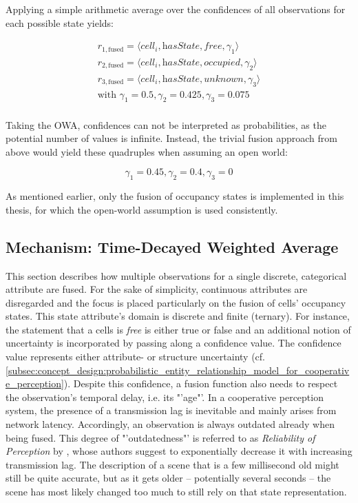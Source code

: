 Applying a simple arithmetic average over the confidences of all observations for each possible state yields:

\begin{gather*}
	r_{1,\text{fused}} = \langle \textit{cell}_i, \textit{hasState}, \textit{free}, \gamma_1 \rangle \\
	r_{2,\text{fused}} = \langle \textit{cell}_i, \textit{hasState}, \textit{occupied}, \gamma_2 \rangle \\
	r_{3,\text{fused}} = \langle \textit{cell}_i, \textit{hasState}, \textit{unknown}, \gamma_3 \rangle \\
	\text{with\ } \gamma_1 = 0.5, \gamma_2 = 0.425, \gamma_3 = 0.075 \\
\end{gather*}

Taking the OWA, confidences can not be interpreted as probabilities, as the potential number of values is infinite. Instead, the trivial fusion approach from above would yield these quadruples when assuming an open world:

$$\gamma_1 = 0.45, \gamma_2 = 0.4, \gamma_3 = 0$$

As mentioned earlier, only the fusion of occupancy states is implemented in this thesis, for which the open-world assumption is used consistently.

\subsection{Mechanism: Time-Decayed Weighted Average}
\label{subsec:concept_design:fusion_mechanism}
This section describes how multiple observations for a single discrete, categorical attribute are fused. For the sake of simplicity, continuous attributes are disregarded and the focus is placed particularly on the fusion of cells' occupancy states. This state attribute's domain is discrete and finite (ternary). For instance, the statement that a cells is \textit{free} is either true or false and an additional notion of uncertainty is incorporated by passing along a confidence value. The confidence value represents either attribute- or structure uncertainty (cf. \cref{subsec:concept_design:probabilistic_entity_relationship_model_for_cooperative_perception}).
Despite this confidence, a fusion function also needs to respect the observation's temporal delay, i.e. its "'age"'. In a cooperative perception system, the presence of a transmission lag is inevitable and mainly arises from network latency. Accordingly, an observation is always outdated already when being fused. This degree of "'outdatedness"' is referred to as \textit{Reliability of Perception} by \cite{liu2013motion}, whose authors suggest to exponentially decrease it with increasing transmission lag. The description of a scene that is a few millisecond old might still be quite accurate, but as it gets older – potentially several seconds – the scene has most likely changed too much to still rely on that state representation. 

